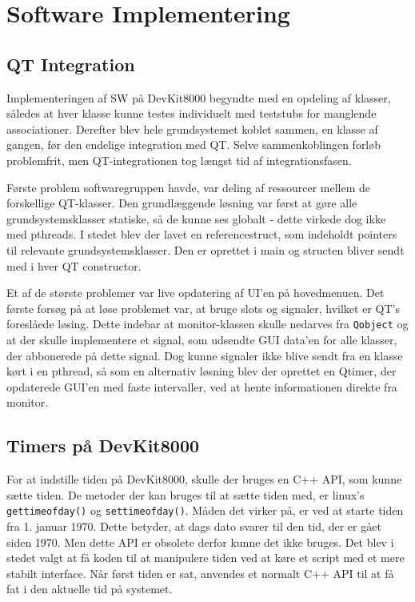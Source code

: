 \section{Software Implementering} \label{ch:SWimplementering}

\subsection{QT Integration}

Implementeringen af SW på DevKit8000 begyndte med en opdeling af klasser, således at hver klasse kunne testes individuelt med teststubs for manglende associationer. 
Derefter blev hele grundsystemet koblet sammen, en klasse af gangen, før den endelige integration med QT. 
Selve sammenkoblingen forløb problemfrit, men QT-integrationen tog længst tid af integrationsfasen.

Første problem softwaregruppen havde, var deling af ressourcer mellem de forskellige QT-klasser. 
Den grundlæggende løsning var først at gøre alle grundsystemsklasser statiske, så de kunne ses globalt - dette virkede dog ikke med pthreads. I stedet blev der lavet en referencestruct, som indeholdt pointers til relevante grundsystemsklasser. Den er oprettet i main og structen bliver sendt med i hver QT constructor. 

Et af de største problemer var live opdatering af UI'en på hovedmenuen. Det første forsøg på at løse problemet var, at bruge slots og signaler, hvilket er QT's foreslåede løsing. Dette indebar at monitor-klassen skulle nedarves fra \texttt{Qobject} \cite{lib:signals} og at der skulle implementere et signal, som udsendte GUI data'en for alle klasser, der abbonerede på dette signal. Dog kunne signaler ikke blive sendt fra en klasse kørt i en pthread, så som en alternativ løsning blev der oprettet en Qtimer, der opdaterede GUI'en med faste intervaller, ved at hente informationen direkte fra monitor.

\subsection{Timers på DevKit8000}

For at indstille tiden på DevKit8000, skulle der bruges en C++ API, som kunne sætte tiden. De metoder der kan bruges til at sætte tiden med, er linux's \texttt{gettimeofday()} og \texttt{settimeofday()}. 
Måden det virker på, er ved at starte tiden fra 1. januar 1970. Dette betyder, at dags dato svarer til den tid, der er gået siden 1970. Men dette API er obsolete derfor kunne det ikke bruges. Det blev i stedet valgt at få koden til at manipulere tiden ved at køre et script med et mere stabilt interface. Når først tiden er sat, anvendes et normalt C++ API til at få fat i den aktuelle tid på systemet.

